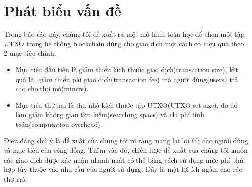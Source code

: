 \section{Phát biểu vấn đề}\label{fornul}

Trong báo cáo này, chúng tôi đề xuất ra một mô hình toán học để chọn một tập UTXO trong hệ thống blockchain dùng cho giao dịch một cách có hiệu quả theo 2 mục tiêu chính.

\begin{itemize}
    \item Mục tiêu đầu tiên là giảm thiểu kích thước giao dịch(transaction size), kết quả là, giảm thiểu phí giao dịch(transaction fee) mà người dùng(users) trả cho cho thợ mỏ(miners).
    \item Mục tiêu thứ hai là thu nhỏ kích thước tập UTXO(UTXO set size), do đó làm giảm không gian tìm kiếm(searching space) và chi phí tính toán(computation overhead).
\end{itemize}

Điều đáng chú ý là đề xuất của chúng tôi rõ ràng mang lại lợi ích cho người dùng và mục tiêu của cộng đồng. Thêm vào đó, chiến lược đề xuất của chúng tôi muốn các giao dịch được xác nhận nhanh nhất có thể bằng cách sử dụng mức phí phù hợp tùy thuộc vào nhu cầu của người sử dụng. Đây là một lợi ích ngầm cho các thợ mỏ.\par